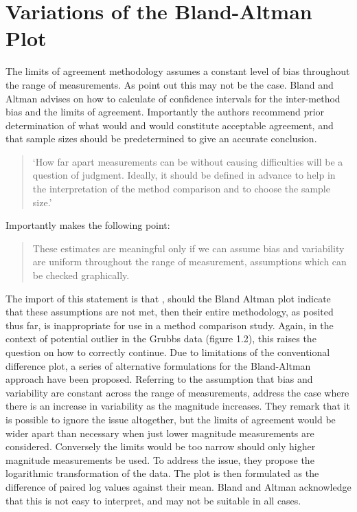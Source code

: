 \documentclass[12pt, a4paper]{report}
\theoremstyle{plain}
\theoremstyle{definition}
\theoremstyle{remark}
\begin{document}
\section{Variations of the Bland-Altman Plot} 
The limits of agreement methodology assumes a constant level of bias throughout the range of measurements. As \citet*{BA86} point out this may not be the case. Bland and Altman advises on how to calculate of confidence intervals for the inter-method bias and
the limits of agreement. Importantly the authors recommend prior determination of what would and would constitute acceptable
agreement, and that sample sizes should be predetermined to give an accurate conclusion.

\begin{quote}
	`How far apart measurements can be without causing difficulties
	will be a question of judgment. Ideally, it should be defined in
	advance to help in the interpretation of the method comparison and
	to choose the sample size.'\citep{BA86}
\end{quote}

Importantly \citet{BA99} makes the following point:
\begin{quote}These estimates are meaningful only if we can assume
	bias and variability are uniform throughout the range of
	measurement, assumptions which can be checked graphically.
\end{quote}

The import of this statement is that , should the Bland Altman plot indicate that these assumptions are not met, then their
entire methodology, as posited thus far, is inappropriate for use
in a method comparison study. Again, in the context of potential
outlier in the Grubbs data (figure 1.2), this raises the question
on how to correctly continue. Due to limitations of the conventional difference plot, a series of alternative formulations for the Bland-Altman approach have been proposed.
Referring to the assumption that bias and variability are constant across the range
of measurements, \citet{BA99} address the case where there is an increase in variability as the magnitude increases. They remark 	that it is possible to ignore the issue altogether, but the limits of agreement would be wider apart than necessary when just lower magnitude measurements are considered. Conversely the limits would be too narrow should only higher magnitude measurements be used. To address the issue, they propose the logarithmic transformation of the data. The plot is then formulated as the difference of paired log values against their mean. Bland and Altman acknowledge that this is not easy to interpret, and may not be suitable in all cases.
\end{document}
